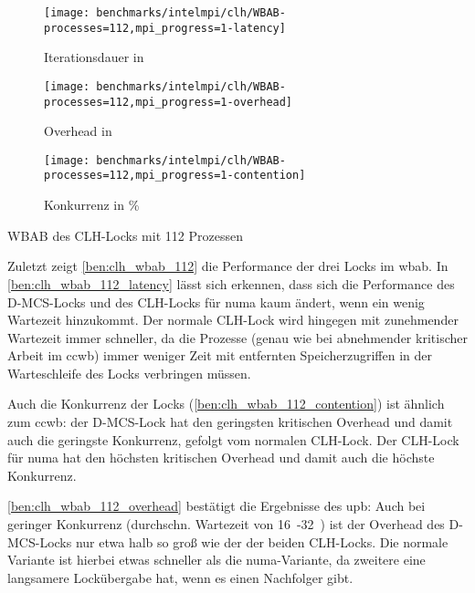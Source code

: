 \clearpage

\begin{benchmark}[h]
    \begin{subfigure}{\textwidth}
        \centering
        \texttt{[image: benchmarks/intelmpi/clh/WBAB-processes=112,mpi\_progress=1-latency]}
        \caption{Iterationsdauer in }
        \label{ben:clh_wbab_112_latency}
    \end{subfigure}
    \begin{subfigure}{.5\textwidth}
        \texttt{[image: benchmarks/intelmpi/clh/WBAB-processes=112,mpi\_progress=1-overhead]}
        \caption{Overhead in }
        \label{ben:clh_wbab_112_overhead}
    \end{subfigure}
    \begin{subfigure}{.5\textwidth}
        \texttt{[image: benchmarks/intelmpi/clh/WBAB-processes=112,mpi\_progress=1-contention]}
        \caption{Konkurrenz in \%}
        \label{ben:clh_wbab_112_contention}
    \end{subfigure}
    \caption{WBAB des CLH-Locks mit 112 Prozessen}
    \label{ben:clh_wbab_112}
\end{benchmark}

Zuletzt zeigt \autoref{ben:clh_wbab_112} die Performance der drei Locks im \gls{wbab}.
In \autoref{ben:clh_wbab_112_latency} lässt sich erkennen,
dass sich die Performance des D-MCS-Locks und des CLH-Locks für \gls{numa} kaum ändert,
wenn ein wenig Wartezeit hinzukommt.
Der normale CLH-Lock wird hingegen mit zunehmender Wartezeit immer schneller,
da die Prozesse (genau wie bei abnehmender kritischer Arbeit im \gls{ccwb}) immer weniger Zeit mit entfernten Speicherzugriffen in der Warteschleife des Locks verbringen müssen.

Auch die \gls{Konkurrenz} der Locks (\autoref{ben:clh_wbab_112_contention}) ist ähnlich zum \gls{ccwb}:
der D-MCS-Lock hat den geringsten kritischen Overhead
und damit auch die geringste \gls{Konkurrenz},
gefolgt vom normalen CLH-Lock.
Der CLH-Lock für \gls{numa} hat den höchsten kritischen Overhead
und damit auch die höchste \gls{Konkurrenz}.

\autoref{ben:clh_wbab_112_overhead} bestätigt die Ergebnisse des \gls{upb}:
Auch bei geringer \gls{Konkurrenz}
(durchschn. Wartezeit von 16~-32~)
ist der Overhead des D-MCS-Locks nur etwa halb so groß
wie der der beiden CLH-Locks.
Die normale Variante ist hierbei etwas schneller
als die \gls{numa}-Variante,
da zweitere eine langsamere Lockübergabe hat,
wenn es einen Nachfolger gibt.

